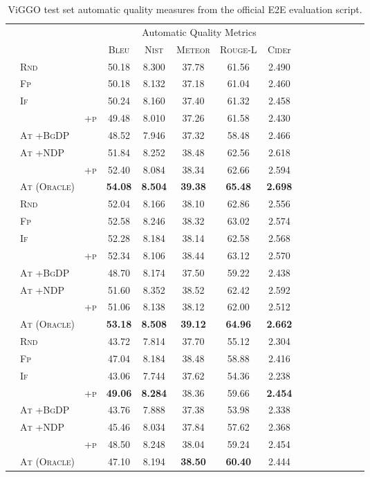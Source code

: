 \begin{table*}
\center

\begin{tabular}{lll c c c c  c c c c  c c c c}
     & & &  \multicolumn{5}{c}{Automatic Quality Metrics} \\
    \cmidrule(lr){4-8} 
     & & &  \textsc{Bleu} &  \textsc{Nist} &  \textsc{Meteor} & \textsc{Rouge-L} & \textsc{Cide}r \\
    \midrule
    \parbox[t]{2mm}{}
    &\textsc{Rnd} & &50.18&8.300&37.78&61.56&2.490 \\
    &\textsc{Fp} & &50.18&8.132&37.18&61.04&2.460 \\
    &\textsc{If} & &50.24&8.160&37.40&61.32&2.458 \\
    &  & \textsc{+p}&49.48&8.010&37.26&61.58&2.430 \\
    &\textsc{At +BgDP} & &48.52&7.946&37.32&58.48&2.466 \\
    &\textsc{At +NDP} & &51.84&8.252&38.48&62.56&2.618 \\
    &  & \textsc{+p}&52.40&8.084&38.34&62.66&2.594 \\
    &\textsc{At (Oracle)} & &\textbf{54.08}&\textbf{8.504}&\textbf{39.38}&\textbf{65.48}&\textbf{2.698} \\
    \midrule
    \parbox[t]{2mm}{}
    &\textsc{Rnd} & &52.04&8.166&38.10&62.86&2.556 \\
    &\textsc{Fp} & &52.58&8.246&38.32&63.02&2.574 \\
    &\textsc{If} & &52.28&8.184&38.14&62.58&2.568 \\
    &  & \textsc{+p}&52.34&8.106&38.44&63.12&2.570 \\
    &\textsc{At +BgDP} & &48.70&8.174&37.50&59.22&2.438 \\
    &\textsc{At +NDP} & &51.60&8.352&38.52&62.42&2.592 \\
    &  & \textsc{+p}&51.06&8.138&38.12&62.00&2.512 \\
    &\textsc{At (Oracle)} & &\textbf{53.18}&\textbf{8.508}&\textbf{39.12}&\textbf{64.96}&\textbf{2.662} \\
    \midrule
    \parbox[t]{2mm}{}
    &\textsc{Rnd} & &43.72&7.814&37.70&55.12&2.304 \\
    &\textsc{Fp} & &47.04&8.184&38.48&58.88&2.416 \\
    &\textsc{If} & &43.06&7.744&37.62&54.36&2.238 \\
    &  & \textsc{+p}&\textbf{49.06}&\textbf{8.284}&38.36&59.66&\textbf{2.454} \\
    &\textsc{At +BgDP} & &43.76&7.888&37.38&53.98&2.338 \\
    &\textsc{At +NDP} & &45.46&8.034&37.84&57.62&2.368 \\
    &  & \textsc{+p}&48.50&8.248&38.04&59.24&2.454 \\
    &\textsc{At (Oracle)} & &47.10&8.194&\textbf{38.50}&\textbf{60.40}&2.444 \\
    \midrule
\end{tabular}



\caption{ViGGO test set automatic quality measures from the official E2E evaluation script.}


\label{app:viggo.auto}
\end{table*}
